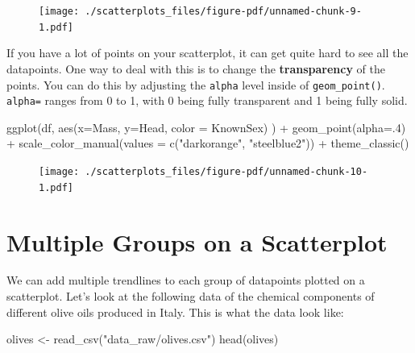 \documentclass[
  letterpaper,
  DIV=11,
  numbers=noendperiod]{scrreprt}
\newenvironment{Shaded}{\begin{snugshade}}{\end{snugshade}}
\newcommand{\AttributeTok}[1]{\textcolor[rgb]{0.40,0.45,0.13}{#1}}
\newcommand{\DecValTok}[1]{\textcolor[rgb]{0.68,0.00,0.00}{#1}}
\newcommand{\FunctionTok}[1]{\textcolor[rgb]{0.28,0.35,0.67}{#1}}
\newcommand{\NormalTok}[1]{\textcolor[rgb]{0.00,0.23,0.31}{#1}}
\newcommand{\OtherTok}[1]{\textcolor[rgb]{0.00,0.23,0.31}{#1}}
\newcommand{\SpecialCharTok}[1]{\textcolor[rgb]{0.37,0.37,0.37}{#1}}
\newcommand{\StringTok}[1]{\textcolor[rgb]{0.13,0.47,0.30}{#1}}
\begin{document}
\begin{figure}[H]

{\centering \texttt{[image: ./scatterplots\_files/figure-pdf/unnamed-chunk-9-1.pdf]}

}

\end{figure}

If you have a lot of points on your scatterplot, it can get quite hard
to see all the datapoints. One way to deal with this is to change the
\textbf{transparency} of the points. You can do this by adjusting the
\texttt{alpha} level inside of \texttt{geom\_point()}. \texttt{alpha=}
ranges from 0 to 1, with 0 being fully transparent and 1 being fully
solid.

\begin{Shaded}
\begin{Highlighting}[]
\FunctionTok{ggplot}\NormalTok{(df, }\FunctionTok{aes}\NormalTok{(}\AttributeTok{x=}\NormalTok{Mass, }\AttributeTok{y=}\NormalTok{Head, }\AttributeTok{color =}\NormalTok{ KnownSex) ) }\SpecialCharTok{+} 
  \FunctionTok{geom\_point}\NormalTok{(}\AttributeTok{alpha=}\NormalTok{.}\DecValTok{4}\NormalTok{) }\SpecialCharTok{+}
  \FunctionTok{scale\_color\_manual}\NormalTok{(}\AttributeTok{values =} \FunctionTok{c}\NormalTok{(}\StringTok{"darkorange"}\NormalTok{, }\StringTok{"steelblue2"}\NormalTok{)) }\SpecialCharTok{+}
  \FunctionTok{theme\_classic}\NormalTok{()}
\end{Highlighting}
\end{Shaded}

\begin{figure}[H]

{\centering \texttt{[image: ./scatterplots\_files/figure-pdf/unnamed-chunk-10-1.pdf]}

}

\end{figure}

\hypertarget{multiple-groups-on-a-scatterplot}{%
\section{Multiple Groups on a
Scatterplot}\label{multiple-groups-on-a-scatterplot}}

We can add multiple trendlines to each group of datapoints plotted on a
scatterplot. Let's look at the following data of the chemical components
of different olive oils produced in Italy. This is what the data look
like:

\begin{Shaded}
\begin{Highlighting}[]
\NormalTok{olives }\OtherTok{\textless{}{-}} \FunctionTok{read\_csv}\NormalTok{(}\StringTok{"data\_raw/olives.csv"}\NormalTok{)}
\FunctionTok{head}\NormalTok{(olives)}
\end{Highlighting}
\end{Shaded}
\end{document}
